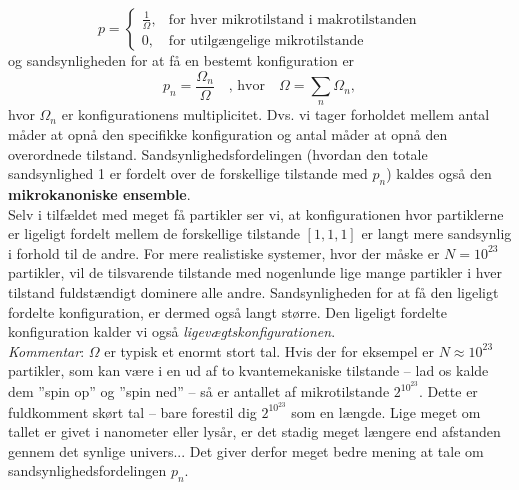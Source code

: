 \begin{equation}\label{eq:fundamentalpostulate}
    p=
    \begin{cases}
        \frac{1}{\Omega}, & \text{for hver mikrotilstand i makrotilstanden}\\
        0, & \text{for utilgængelige mikrotilstande}
    \end{cases}
\end{equation}
og sandsynligheden for at få en bestemt konfiguration er
\begin{equation}\label{eq:microcanonical}
    p_n=\frac{\Omega_n}{\Omega}\quad\text{, hvor}\quad \Omega=\sum_n\Omega_n,
\end{equation}
hvor $\Omega_n$ er konfigurationens multiplicitet. Dvs. vi tager forholdet mellem antal måder at opnå den specifikke konfiguration og antal måder at opnå den overordnede tilstand.  Sandsynlighedsfordelingen (hvordan den totale sandsynlighed 1 er fordelt over de forskellige tilstande med $p_n$) kaldes også den \textbf{mikrokanoniske ensemble}.\\
\indent Selv i tilfældet med meget få partikler ser vi, at konfigurationen hvor partiklerne er ligeligt fordelt mellem de forskellige tilstande $[1,1,1]$ er langt mere sandsynlig i forhold til de andre. For mere realistiske systemer, hvor der måske er $N=10^{23}$ partikler, vil de tilsvarende tilstande med nogenlunde lige mange partikler i hver tilstand fuldstændigt dominere alle andre. Sandsynligheden for at få den ligeligt fordelte konfiguration, er dermed også langt større. Den ligeligt fordelte konfiguration kalder vi også \emph{ligevægtskonfigurationen}.\\[12pt]
\indent \textit{Kommentar}: $\Omega$ er typisk et enormt stort tal. Hvis der for eksempel er $N\approx 10^{23}$ partikler, som kan være i en ud af to kvantemekaniske tilstande -- lad os kalde dem ''spin op'' og ''spin ned'' -- så er antallet af mikrotilstande $2^{10^{23}}$. Dette er fuldkomment skørt tal -- %
bare forestil dig $2^{10^{23}}$ som en længde. Lige meget om tallet er givet i nanometer eller lysår, er det stadig meget længere end afstanden gennem det synlige univers... Det giver derfor meget bedre mening at tale om sandsynlighedsfordelingen $p_n$.


